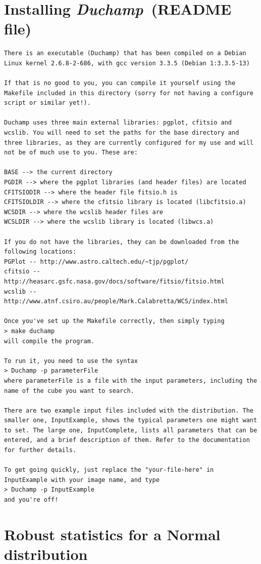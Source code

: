\documentclass[12pt,a4paper]{article}
\newcommand{\duchamp}{\emph{Duchamp}}
\begin{document}
\newpage
\section{Installing \duchamp\ (README file)}
\begin{verbatim}
There is an executable (Duchamp) that has been compiled on a Debian
Linux kernel 2.6.8-2-686, with gcc version 3.3.5 (Debian 1:3.3.5-13)

If that is no good to you, you can compile it yourself using the
Makefile included in this directory (sorry for not having a configure
script or similar yet!).

Duchamp uses three main external libraries: pgplot, cfitsio and
wcslib. You will need to set the paths for the base directory and
three libraries, as they are currently configured for my use and will
not be of much use to you. These are:

BASE --> the current directory
PGDIR --> where the pgplot libraries (and header files) are located
CFITSIODIR --> where the header file fitsio.h is
CFITSIOLDIR --> where the cfitsio library is located (libcfitsio.a)
WCSDIR --> where the wcslib header files are
WCSLDIR --> where the wcslib library is located (libwcs.a)

If you do not have the libraries, they can be downloaded from the
following locations: 
PGPlot -- http://www.astro.caltech.edu/~tjp/pgplot/
cfitsio -- http://heasarc.gsfc.nasa.gov/docs/software/fitsio/fitsio.html
wcslib -- http://www.atnf.csiro.au/people/Mark.Calabretta/WCS/index.html

Once you've set up the Makefile correctly, then simply typing
> make duchamp
will compile the program.

To run it, you need to use the syntax
> Duchamp -p parameterFile
where parameterFile is a file with the input parameters, including the
name of the cube you want to search.

There are two example input files included with the distribution. The
smaller one, InputExample, shows the typical parameters one might want
to set. The large one, InputComplete, lists all parameters that can be
entered, and a brief description of them. Refer to the documentation
for further details.

To get going quickly, just replace the "your-file-here" in
InputExample with your image name, and type
> Duchamp -p InputExample
and you're off!
\end{verbatim}

\section{Robust statistics for a Normal distribution}
\label{app-madfm}
\end{document}
